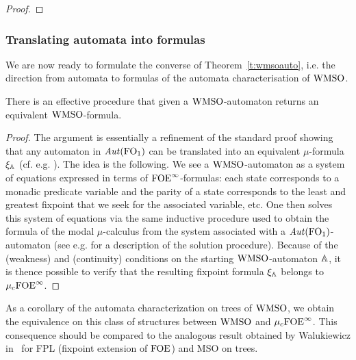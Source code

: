 \begin{proof}
%
\end{proof}


\subsubsection{Translating automata into formulas}
We are now ready to formulate the converse of Theorem~\ref{t:wmsoauto}, i.e. the direction from automata to formulas of the automata characterisation of $\mathrm{WMSO}$.

\begin{theorem}\label{thm:wmso_autofor}
There is an effective procedure that given a $\mathrm{WMSO}$-automaton returns an equivalent $\mathrm{WMSO}$-formula.
\end{theorem}
\begin{proof}
The argument is essentially a refinement of the standard proof showing that any automaton in $\mathit{Aut}(\mathrm{FO}_1)$ can be translated into an equivalent $\mu$-formula
$\xi_\mathbb{A}$ (cf. e.g. \cite{Ven08}).
The idea is the following. We see a $\mathrm{WMSO}$-automaton as a system of equations expressed in terms of ${\mathrm{FOE}}^\infty$-formulas: each state corresponds to a monadic predicate variable and the parity of a state corresponds to the least and greatest fixpoint that we seek for the associated variable, etc. One then solves this system of equations via the same inductive procedure used to obtain the formula of the modal $\mu$-calculus from the system associated with a $\mathit{Aut}(\mathrm{FO}_1)$-automaton (see e.g. \cite{ArnoldN01} for a description of the solution procedure). Because of the (weakness) and (continuity) conditions on the starting $\mathrm{WMSO}$-automaton $\mathbb{A}$, it is thence possible to verify that the resulting fixpoint formula $\xi_\mathbb{A}$ belongs to $\mu_{c}{\mathrm{FOE}}^\infty$.
\end{proof}

\begin{remark}
As a corollary of the automata characterization on trees of $\mathrm{WMSO}$, we obtain the equivalence on this class of structures between $\mathrm{WMSO}$ and $\mu_{c}{\mathrm{FOE}}^\infty$. This consequence should be compared to the analogous result obtained by Walukiewicz in~\cite{Walukiewicz96} for FPL (fixpoint extension of $\mathrm{FOE}$) and MSO on trees.
\end{remark}

